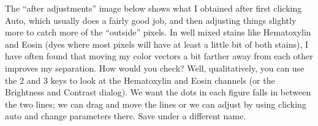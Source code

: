 \documentclass[a4paper,12pt]{article}
\begin{document}
\begin{enumerate}
\begin{itemize}
    The “after adjustments” image below shows what I obtained after first clicking Auto, which usually does a fairly good job, and then adjusting things slightly more to catch more of the “outside” pixels. In well mixed stains like Hematoxylin and Eosin (dyes where most pixels will have at least a little bit of both stains), I have often found that moving my color vectors a bit farther away from each other improves my separation. How would you check? Well, qualitatively, you can use the 2 and 3 keys to look at the Hematoxylin and Eosin channels (or the Brightness and Contrast dialog).
    We want the dots in each figure falls in between the two lines; we can drag and move the lines or we can adjust by using clicking auto and change parameters there. Save under a different name.
    \end{itemize}   


\end{enumerate}
\end{document}
